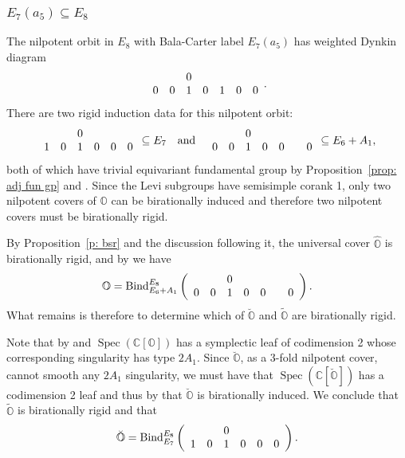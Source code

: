 \documentclass[11pt]{amsart}
\newcommand{\C}{{\mathbb C}}
\renewcommand{\O}{{\mathbb O}}
\newcommand{\Spec}{\operatorname{Spec}}
\newcommand{\BInd}{{{\mbox{\rm Bind}}}}
\newcommand{\covO}{\widetilde{\O}}
\newcommand{\hatO}{\widehat{\O}}
\newcommand{\breveO}{\breve{\O}}
\numberwithin{equation}{section}
\begin{document}
	
	
	\subsubsection{\texorpdfstring{$E_7(a_5)\subseteq E_8$}{E7a5 in E8}}\label{sss: E7a5 in E8}
	
	The nilpotent orbit in $E_8$ with Bala-Carter label $E_7(a_5)$ has weighted Dynkin diagram 
	$$\begin{array}{c c c c c c c}
		& & 0 & & & &  \\
		0 & 0 & 1 & 0 & 1 & 0 & 0 \\
	\end{array}.$$
	There are two rigid induction data for this nilpotent orbit: $$\begin{array}{c c c c c c}
		& & 0 & & & \\
		1 & 0 & 1 & 0 & 0 & 0  \\
	\end{array}\subseteq E_7\quad\mbox{and}\quad \begin{array}{c c c c c c c}
		& & 0 &  & & &\\
		0 & 0 & 1 & 0 & 0 & & 0\\
	\end{array}\subseteq E_6 + A_1,$$ both of which have trivial equivariant fundamental group by Proposition~\ref{prop: adj fun gp} and \cite[\S 8.4]{CM}. Since the Levi subgroups have semisimple corank 1, only two nilpotent covers of $\O$ can be birationally induced and therefore two nilpotent covers must be birationally rigid.
	
	By Proposition~\ref{p: bsr} and the discussion following it, the universal cover $\hatO$ is birationally rigid, and by \cite[Proposition 3.1]{Fu} we have $$\O=\BInd_{E_6+A_1}^{E_8}\left( \begin{array}{c c c c c c c}
		& & 0 &  & & &\\
		0 & 0 & 1 & 0 & 0 & & 0\\
	\end{array} \right).$$ What remains is therefore to determine which of $\breveO$ and $\covO$ are birationally rigid.
	
	Note that by \cite{FJLS} and \cite[Lemma 3.2.2]{MM} $\Spec(\C[\O])$ has a symplectic leaf of codimension 2 whose corresponding singularity has type $2A_1$. Since $\breveO$, as a 3-fold nilpotent cover, cannot smooth any $2A_1$ singularity, we must have that $\Spec(\C[\breveO])$ has a codimension 2 leaf and thus by \cite[Corollary 7.6.1]{LMM} that $\breveO$ is birationally induced. We conclude that $\covO$ is birationally rigid and that $$\breveO=\BInd_{E_7}^{E_8}\left( \begin{array}{c c c c c c}
		& & 0 &  & &\\
		1 & 0 & 1 & 0 & 0 & 0\\
	\end{array} \right).$$ 
	
\end{document}
